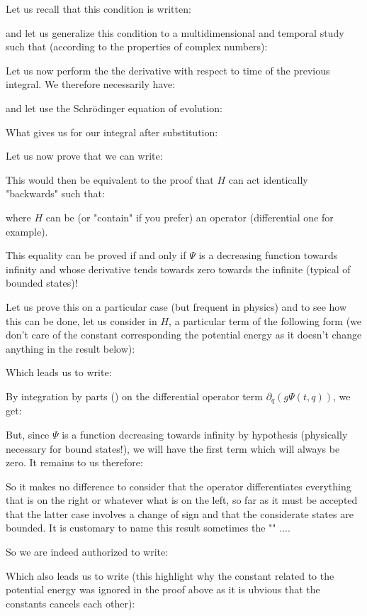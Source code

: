 	Let us recall that this condition is written:
	
	and let us generalize this condition to a multidimensional and temporal study such that (according to the properties of complex numbers):
	
	Let us now perform the the derivative with respect to time of the previous integral. We therefore necessarily have:
	
	and let use the Schrödinger equation of evolution:
	
	What gives us for our integral after substitution:
	
	Let us now prove that we can write:
	
	This would then be equivalent to the proof that $H$ can act identically "backwards" such that:
	
	where $H$ can be (or "contain" if you prefer) an operator (differential one for example).
	
	This equality can be proved if and only if $\Psi$ is a decreasing function  towards infinity and whose derivative tends towards zero towards the infinite (typical of bounded states)!
	
	Let us prove this on a particular case (but frequent in physics) and to see how this can be done, let us consider in $H$, a particular term of the following form (we don't care of the constant corresponding the potential energy as it doesn't change anything in the result below):
	
	Which leads us to write:
	
	By integration by parts () on the differential operator term $\partial_q (g\Psi(t,q))$, we get:
	
	But, since $\Psi$  is a function decreasing towards infinity by hypothesis (physically necessary for bound states!), we will have the first term which will always be zero. It remains to us therefore:
	
	So it makes no difference to consider that the operator differentiates everything that is on the right or whatever what is on the left, so far as it must be accepted that the latter case involves a change of sign and that the considerate states are bounded. It is customary to name this result sometimes the "" ....
	
	So we are indeed authorized to write:
	
	Which also leads us to write (this highlight why the constant related to the potential energy was ignored in the proof above as it is ubvious that the constants cancels each other):
	
